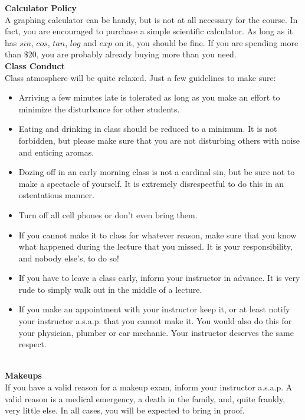 \documentclass [11pt]{article}
\begin{document}
   {\bf Calculator Policy}\\
   A graphing calculator can be handy, but is not at all necessary for the course.
   In fact, you are encouraged to purchase a simple scientific calculator. As long
   as it has $sin$, $cos$, $tan$, $log$ and $exp$ on it, you should be fine. If you
   are spending more than $\$20$, you are probably already buying more than you need.
   \ \\

   {\bf Class Conduct}\\
   Class atmosphere will be quite relaxed. Just a few guidelines to make sure:
   \begin{itemize}
     \item  Arriving a few minutes late is tolerated as long as you make an effort
       to minimize the disturbance for other students. 
     \item  Eating and drinking in class should be reduced to a minimum. It is not
       forbidden, but please make sure that you are not disturbing others with noise
       and enticing aromas.
     \item  Dozing off in an early morning class is not a cardinal sin, but be
       sure not to make a spectacle of yourself. It is extremely disrespectful
       to do this in an ostentatious manner.
     \item  Turn off all cell phones or don't even bring them. 
     \item  If you cannot make it to class for whatever reason, make sure that
       you know what happened during the lecture that you missed. It is
       your responsibility, and nobody else's, to do so!
     \item  If you have to leave a class early, inform your instructor in
       advance. It is very rude to simply walk out in the middle of a
       lecture. 
     \item  If you make an appointment with your instructor keep it, or at
       least notify your instructor a.s.a.p. that you cannot make it. You
       would also do this for your physician, plumber or car mechanic.
       Your instructor deserves the same respect.
    \end{itemize}
   \ \\
       
   {\bf Makeups}\\
   If you have a valid reason for a makeup exam, inform your instructor
   a.s.a.p. A valid reason is a medical emergency, a death in the family, and, quite frankly, 
   very little else. In all cases, you will be expected to bring in proof.\\
   \ \\
\end{document}
